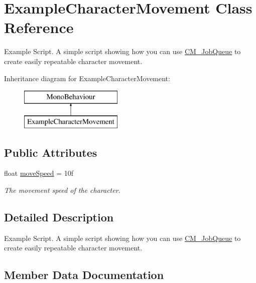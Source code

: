 \hypertarget{class_example_character_movement}{}\section{Example\+Character\+Movement Class Reference}
\label{class_example_character_movement}


Example Script. A simple script showing how you can use \hyperlink{class_c_m___job_queue}{C\+M\+\_\+\+Job\+Queue} to create easily repeatable character movement.  


Inheritance diagram for Example\+Character\+Movement\+:\begin{figure}[H]
\begin{center}
\leavevmode
\includegraphics[height=2.000000cm]{class_example_character_movement}
\end{center}
\end{figure}
\subsection*{Public Attributes}
\begin{DoxyCompactItemize}
\item 
float \hyperlink{class_example_character_movement_a2b35a1171dcecd39d3a8f60c5d5b037a}{move\+Speed} = 10f
\begin{DoxyCompactList}\small\item\em The movement speed of the character. \end{DoxyCompactList}\end{DoxyCompactItemize}


\subsection{Detailed Description}
Example Script. A simple script showing how you can use \hyperlink{class_c_m___job_queue}{C\+M\+\_\+\+Job\+Queue} to create easily repeatable character movement. 



\subsection{Member Data Documentation}
\hypertarget{class_example_character_movement_a2b35a1171dcecd39d3a8f60c5d5b037a}{}
